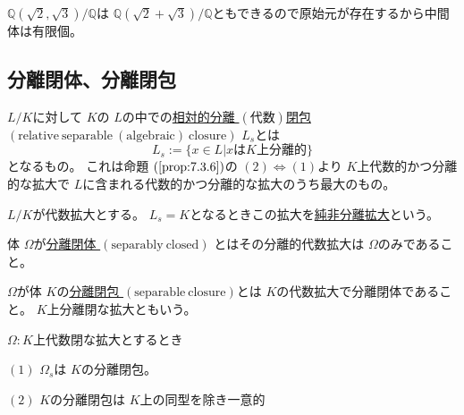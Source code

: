\documentclass[../master_galois_theory]{subfiles}
\begin{document}
\begin{exam}
  $\mathbb{Q}(\sqrt{2} , \sqrt{3})/\mathbb{Q}$は
  $\mathbb{Q}(\sqrt{2} + \sqrt{3})/\mathbb{Q}$ともできるので原始元が存在するから中間体は有限個。
\end{exam}

\subsection{分離閉体、分離閉包}

\begin{defi}
  $L/K$に対して $K$の $L$の中での\underline{相対的分離 $(代数)$閉包 $(\mathrm{relative \  separable \  (algebraic) \  closure})$} $L_s$とは
  \[
  L_s := \{ x \in L | xは K上分離的 \}
  \]
  となるもの。
  これは命題 $(\mathrm{\ref{prop:7.3.6}})$の $(2) \Leftrightarrow (1)$より $K$上代数的かつ分離的な拡大で
  $L$に含まれる代数的かつ分離的な拡大のうち最大のもの。
\end{defi}

\begin{defi}
  $L/K$が代数拡大とする。
  $L_s = K$となるときこの拡大を\underline{純非分離拡大}という。
\end{defi}

\begin{defi}
  体 $\Omega$が\underline{分離閉体 $(\mathrm{separably \  closed})$}
  とはその分離的代数拡大は $\Omega$のみであること。
\end{defi}

\begin{defi}
  $\Omega$が体 $K$の\underline{分離閉包 $(\mathrm{separable \  closure})$}とは
  $K$の代数拡大で分離閉体であること。
  $K$上分離閉な拡大ともいう。
\end{defi}

\begin{prop} \label{prop:9.11}
  $\Omega:K$上代数閉な拡大とするとき

  $(1)$
  $\Omega_s$は $K$の分離閉包。

  $(2)$
  $K$の分離閉包は $K$上の同型を除き一意的
\end{prop}
\end{document}
